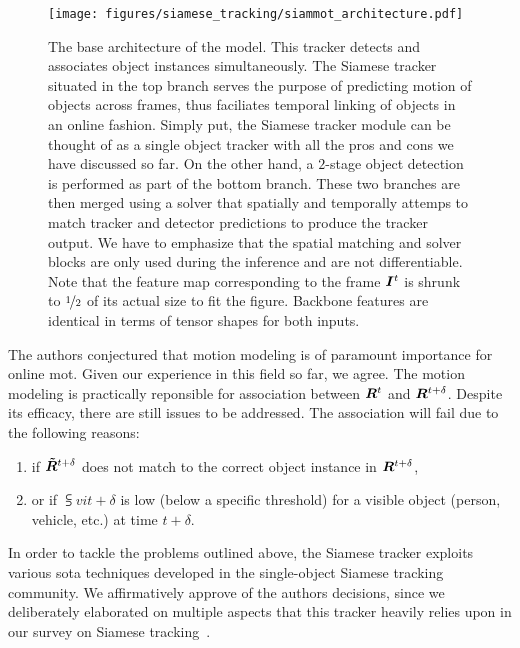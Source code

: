\begin{figure}[t]
    \centering
    \texttt{[image: figures/siamese\_tracking/siammot\_architecture.pdf]}
    \caption[\siammot{} architecture]{The base architecture of the \siammot{} model. This tracker detects and associates object instances simultaneously. The Siamese tracker situated in the top branch serves the purpose of predicting motion of objects across frames, thus faciliates temporal linking of objects in an online fashion. Simply put, the Siamese tracker module can be thought of as a single object tracker with all the pros and cons we have discussed so far. On the other hand, a $2$-stage object detection is performed as part of the bottom branch. These two branches are then merged using a solver that spatially and temporally attemps to match tracker and detector predictions to produce the tracker output. We have to emphasize that the spatial matching and solver blocks are only used during the inference and are not differentiable. Note that the feature map corresponding to the frame $\bm{I}^{t}$ is shrunk to $\nicefrac{1}{2}$ of its actual size to fit the figure. Backbone features are identical in terms of tensor shapes for both inputs. }
    \label{fig:SiamMOTArchitecture}
\end{figure}

The authors conjectured that motion modeling is of paramount importance for online \gls{mot}. Given our experience in this field so far, we agree. The motion modeling is practically reponsible for association between $\bm{R}^{t}$ and $\bm{R}^{t + \delta}$. Despite its efficacy, there are still issues to be addressed. The association will fail due to the following reasons:
\begin{enumerate}
    \item if $\bm{\tilde{R}}^{t + \delta}$ does not match to the correct object instance in $\bm{R}^{t + \delta}$,
    \item or if $\subsup{v}{i}{t + \delta}$ is low (below a specific threshold) for a visible object (person, vehicle, etc.) at time $t + \delta$.
\end{enumerate}
In order to tackle the problems outlined above, the Siamese tracker exploits various \gls{sota} techniques developed in the single-object Siamese tracking community. We affirmatively approve of the authors decisions, since we deliberately elaborated on multiple aspects that this tracker heavily relies upon in our survey on Siamese tracking~\cite{ondrasovic2021siamese}.

